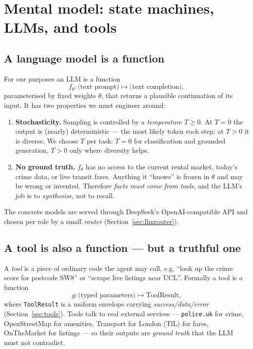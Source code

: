 \documentclass[11pt,a4paper]{article}
\newcommand{\code}[1]{\texttt{\small #1}}
\begin{document}
\section{Mental model: state machines, LLMs, and tools}
\label{sec:mentalmodel}

\subsection{A language model is a function}
For our purposes an LLM is a function
\[
  f_\theta : \text{(text prompt)} \longmapsto \text{(text completion)},
\]
parameterised by fixed weights $\theta$, that returns a plausible continuation of
its input. It has two properties we must engineer around:
\begin{enumerate}[leftmargin=1.6em]
  \item \textbf{Stochasticity.} Sampling is controlled by a \emph{temperature}
        $T\ge 0$. At $T=0$ the output is (nearly) deterministic --- the most likely
        token each step; at $T>0$ it is diverse. We choose $T$ per task: $T=0$ for
        classification and grounded generation, $T>0$ only where diversity helps.
  \item \textbf{No ground truth.} $f_\theta$ has no access to the current rental
        market, today's crime data, or live transit fares. Anything it ``knows'' is
        frozen in $\theta$ and may be wrong or invented. Therefore \emph{facts must
        come from tools}, and the LLM's job is to \emph{synthesise}, not to recall.
\end{enumerate}

The concrete models are served through DeepSeek's OpenAI-compatible API and chosen
per role by a small \emph{router} (Section~\ref{sec:llmrouter}).

\subsection{A tool is also a function --- but a truthful one}
A \emph{tool} is a piece of ordinary code the agent may call, e.g. ``look up the
crime score for postcode SW8'' or ``scrape live listings near UCL''. Formally a tool
is a function
\[
  g : \text{(typed parameters)} \longmapsto \text{ToolResult},
\]
where \code{ToolResult} is a uniform envelope carrying \emph{success/data/error}
(Section~\ref{sec:tools}). Tools talk to real external services --- \code{police.uk}
for crime, OpenStreetMap for amenities, Transport for London (TfL) for fares,
OnTheMarket for listings --- so their outputs are \emph{ground truth} that the LLM
must not contradict.
\end{document}
